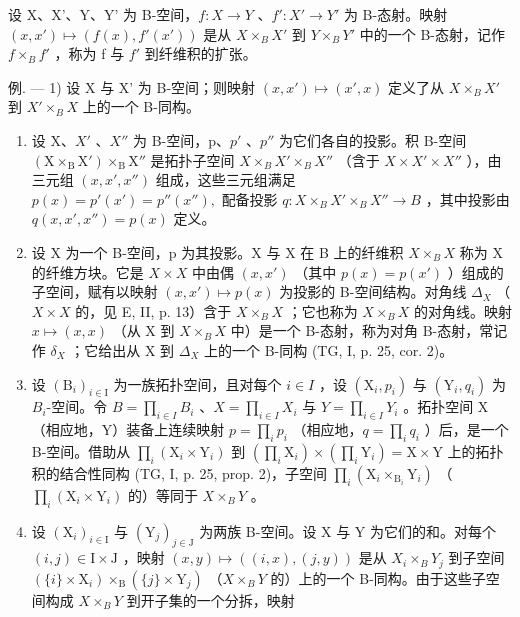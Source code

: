设 X、X'、Y、Y' 为 B-空间，\(f: X \to Y\) 、\(f': X' \to Y'\) 为 B-态射。映射 \((x, x') \mapsto (f(x), f'(x'))\) 是从 \(X \times_{B} X'\) 到 \(Y \times_{B} Y'\) 中的一个 B-态射，记作 \(f \times_{B} f'\) ，称为 f 与 \(f'\) 到纤维积的扩张。

例. --- 1) 设 X 与 X' 为 B-空间；则映射 \((x, x') \mapsto (x', x)\) 定义了从 \(X \times_{B} X'\) 到 \(X' \times_{B} X\) 上的一个 B-同构。

\begin{enumerate}
\def\labelenumi{\arabic{enumi})}
\setcounter{enumi}{1}
\item
  设 X、\(X'\) 、\(X''\) 为 B-空间，p、\(p'\) 、\(p''\) 为它们各自的投影。积 B-空间 \((\mathrm{X} \times_{\mathrm{B}} \mathrm{X}') \times_{\mathrm{B}} \mathrm{X}''\) 是拓扑子空间 \(X \times_{B} X' \times_{B} X''\) （含于 \(X \times X' \times X''\) ），由三元组 \((x, x', x'')\) 组成，这些三元组满足 \(p(x) = p'(x') = p''(x''), \text{ 配备投影 } q: X \times_{B} X' \times_{B} X'' \to B\) ，其中投影由 \(q(x, x', x'') = p(x)\) 定义。
\item
  设 X 为一个 B-空间，p 为其投影。X 与 X 在 B 上的纤维积 \(X \times_{B} X\) 称为 X 的纤维方块。它是 \(X \times X\) 中由偶 \((x, x')\) （其中 \(p(x) = p(x')\) ）组成的子空间，赋有以映射 \((x, x') \mapsto p(x)\) 为投影的 B-空间结构。对角线 \(\Delta_{X}\) （\(X \times X\) 的，见 E, II, p. 13）含于 \(X \times_{B} X\) ；它也称为 \(X \times_{B} X\) 的对角线。映射 \(x \mapsto (x, x)\) （从 X 到 \(X \times_{B} X\) 中）是一个 B-态射，称为对角 B-态射，常记作 \(\delta_{X}\) ；它给出从 X 到 \(\Delta_{X}\) 上的一个 B-同构 (TG, I, p. 25, cor. 2)。
\item
  设 \((\mathrm{B}_{i})_{i\in\mathrm{I}}\) 为一族拓扑空间，且对每个 \(i\in I\) ，设 \((\mathrm{X}_{i},p_{i})\) 与 \((\mathrm{Y}_{i},q_{i})\) 为 \(B_{i}\)-空间。令 \(B=\prod_{i\in I}B_{i}\) 、\(X=\prod_{i\in I}X_{i}\) 与 \(Y=\prod_{i\in I}Y_{i}\) 。拓扑空间 X（相应地，Y）装备上连续映射 \(p=\prod_{i}p_{i}\) （相应地，\(q=\prod_{i}q_{i}\) ）后，是一个 B-空间。借助从 \(\prod_{i}(\mathrm{X}_{i}\times\mathrm{Y}_{i})\) 到 \((\prod_{i}\mathrm{X}_{i})\times(\prod_{i}\mathrm{Y}_{i})=\mathrm{X}\times\mathrm{Y}\) 上的拓扑积的结合性同构 (TG, I, p. 25, prop. 2)，子空间 \(\prod_{i}(\mathrm{X}_{i}\times_{\mathrm{B}_{i}}\mathrm{Y}_{i})\) （\(\prod_{i}(\mathrm{X}_{i}\times\mathrm{Y}_{i})\) 的）等同于 \(X\times_{B}Y\) 。
\item
  设 \((\mathrm{X}_{i})_{i\in\mathrm{I}}\) 与 \((\mathrm{Y}_{j})_{j\in\mathrm{J}}\) 为两族 B-空间。设 X 与 Y 为它们的和。对每个 \((i,j)\in\mathrm{I}\times\mathrm{J}\) ，映射 \((x,y)\mapsto((i,x),(j,y))\) 是从 \(X_{i}\times_{B}Y_{j}\) 到子空间 \((\{i\}\times\mathrm{X}_{i})\times_{\mathrm{B}}(\{j\}\times\mathrm{Y}_{j})\) （\(X\times_{B}Y\) 的）上的一个 B-同构。由于这些子空间构成 \(X\times_{B}Y\) 到开子集的一个分拆，映射
\end{enumerate}

